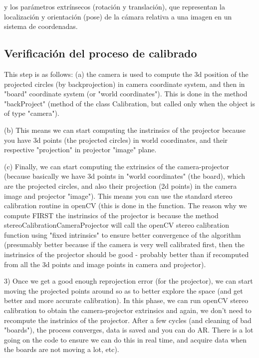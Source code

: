  y los parámetros extrínsecos (rotación y translación), que
representan la localización y orientación (pose) de la cámara relativa a una imagen en un sistema de coordenadas.

\subsection{Verificación del proceso de calibrado}

This step is as follows: (a) the camera is used to compute the 3d position of the projected circles (by backprojection) in camera coordinate system, and then in "board" coordinate system (or "world coordinates"). This is done in the method "backProject" (method of the class Calibration, but called only when the object is of type "camera").

 (b) This means we can start computing the instrinsics of the projector because you have 3d points (the projected circles) in world coordinates, and their respective "projection" in projector "image" plane. 

(c) Finally, we can start computing the extrinsics of the camera-projector (because basically we have 3d points in "world coordinates" (the board), which are the projected circles, and also their projection (2d points) in the camera image and projector "image"). This means you can use the standard stereo calibration routine in openCV (this is done in the function. The reason why we compute FIRST the instrinsics of the projector is because the method stereoCalibrationCameraProjector will call the openCV stereo calibration function using "fixed intrinsics" to ensure better convergence of the algorithm (presumably better because if the camera is very well calibrated first, then the instrinsics of the projector should be good - probably better than if recomputed from all the 3d points and image points in camera and projector).

3) Once we get a good enough reprojection error (for the projector), we can start moving the projected points around so as to better explore the space (and get better and more accurate calibration). In this phase, we can run openCV stereo calibration to obtain the camera-projector extrinsics and again, we don't need to recompute the instrinics of the projector. After a few cycles (and cleaning of bad "boards"), the process converges, data is saved and you can do AR.
There is a lot going on the code to ensure we can do this in real time, and acquire data when the boards are not moving a lot, etc).



